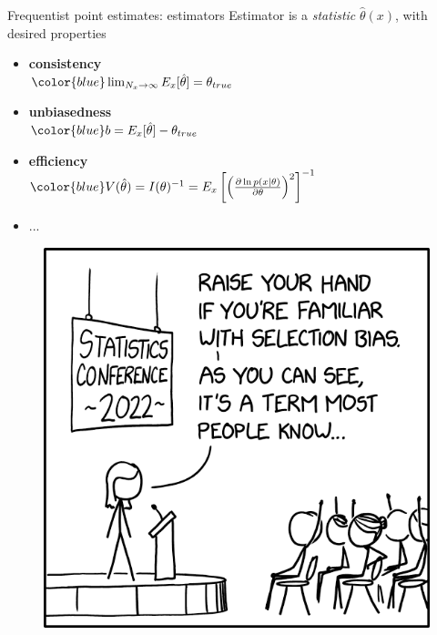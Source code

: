 \documentclass[
aspectratio=169,
14pt,
professionalfonts
]{beamer}
\begin{document}
\begin{frame}{Frequentist point estimates: estimators}
    Estimator is a \textit{statistic} $\hat \theta(x)$, with desired properties
    \begin{minipage}{0.65\textwidth}
        \begin{itemize}
            \item \textbf{consistency}\\
            $
            \color{blue}
            \lim_{N_x \to \infty} E_x[\hat \theta] = \theta_{true}
            $
            \item \textbf{unbiasedness}\\
            $
            \color{blue}
            b = E_x[\hat \theta] - \theta_{true}
            $
            
            \item \textbf{efficiency}\\
            $
            \color{blue}
            V(\hat \theta) = I(\theta)^{-1} = E_x\left[\left(\frac{\partial \ln p(x|\theta)}{\partial \theta}\right)^2\right]^{-1}
            $
            \item ...
        \end{itemize}
    \end{minipage}
    \begin{minipage}{0.34\textwidth}
        \begin{figure}
            \centering
            \includegraphics[width=\linewidth]{../plots/selection_bias_2x.png}
        \end{figure}
    \end{minipage}
\end{frame}
\end{document}
